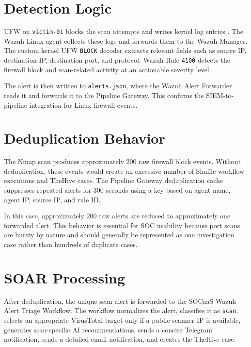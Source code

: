 \section{Detection Logic}
\label{sec:annex-a-detection-logic}

UFW on \texttt{victim-01} blocks the scan attempts and writes kernel log entries \cite{ch4-ufw-docs}. The Wazuh Linux agent collects these logs and forwards them to the Wazuh Manager. The custom kernel UFW \texttt{BLOCK} decoder extracts relevant fields such as source IP, destination IP, destination port, and protocol. Wazuh Rule \texttt{4100} detects the firewall block and scan-related activity at an actionable severity level.

The alert is then written to \texttt{alerts.json}, where the Wazuh Alert Forwarder reads it and forwards it to the Pipeline Gateway. This confirms the SIEM-to-pipeline integration for Linux firewall events.

\section{Deduplication Behavior}
\label{sec:annex-a-deduplication-behavior}

The Nmap scan produces approximately 200 raw firewall block events. Without deduplication, these events would create an excessive number of Shuffle workflow executions and TheHive cases. The Pipeline Gateway deduplication cache suppresses repeated alerts for 300 seconds using a key based on agent name, agent IP, source IP, and rule ID.

In this case, approximately 200 raw alerts are reduced to approximately one forwarded alert. This behavior is essential for SOC usability because port scans are bursty by nature and should generally be represented as one investigation case rather than hundreds of duplicate cases.

\section{SOAR Processing}
\label{sec:annex-a-soar-processing}

After deduplication, the unique scan alert is forwarded to the SOCaaS Wazuh Alert Triage Workflow. The workflow normalizes the alert, classifies it as \texttt{scan}, selects an appropriate VirusTotal target only if a public scanner IP is available, generates scan-specific AI recommendations, sends a concise Telegram notification, sends a detailed email notification, and creates the TheHive case.


